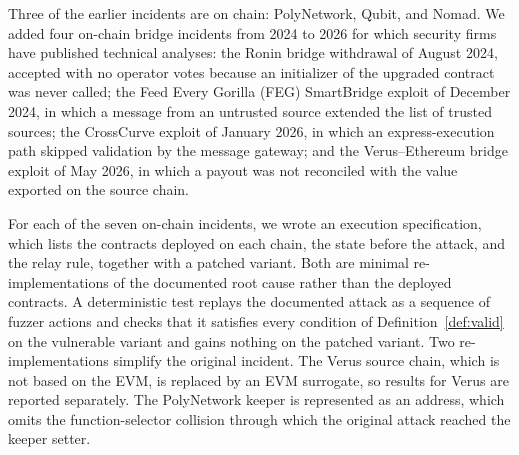 \documentclass[a4paper]{cas-sc}
\begin{document}
Three of the earlier incidents are on chain: PolyNetwork, Qubit, and Nomad. We added four on-chain bridge incidents from 2024 to 2026 for which security firms have published technical analyses: the Ronin bridge withdrawal of August 2024, accepted with no operator votes because an initializer of the upgraded contract was never called; the Feed Every Gorilla (FEG) SmartBridge exploit of December 2024, in which a message from an untrusted source extended the list of trusted sources; the CrossCurve exploit of January 2026, in which an express-execution path skipped validation by the message gateway; and the Verus--Ethereum bridge exploit of May 2026, in which a payout was not reconciled with the value exported on the source chain.

For each of the seven on-chain incidents, we wrote an execution specification, which lists the contracts deployed on each chain, the state before the attack, and the relay rule, together with a patched variant. Both are minimal re-implementations of the documented root cause rather than the deployed contracts. A deterministic test replays the documented attack as a sequence of fuzzer actions and checks that it satisfies every condition of Definition~\ref{def:valid} on the vulnerable variant and gains nothing on the patched variant. Two re-implementations simplify the original incident. The Verus source chain, which is not based on the EVM, is replaced by an EVM surrogate, so results for Verus are reported separately. The PolyNetwork keeper is represented as an address, which omits the function-selector collision through which the original attack reached the keeper setter.
\end{document}

